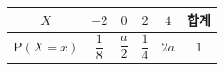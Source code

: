 {\setlength{\tabcolsep}{6pt}\renewcommand{\arraystretch}{1.8}%
\begin{tabular}{|c|c|c|c|c|c|}
\hline
$X$ & $-2$ & $0$ & $2$ & $4$ & \textbf{합계} \\
\hline
$\mathrm{P}(X=x)$ & $\dfrac{1}{8}$ & $\dfrac{a}{2}$ & $\dfrac{1}{4}$ & $2a$ & $1$ \\
\hline
\end{tabular}}
